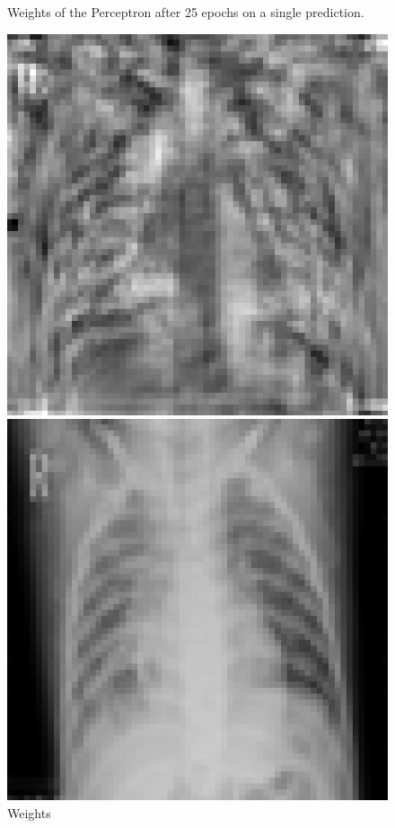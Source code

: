 \documentclass{article}
\begin{document}
\begin{figure}[!ht]
\centering
\caption*{Weights of the Perceptron after 25 epochs on a single prediction.}
  \includegraphics[width=\linewidth]{assets/perceptron/training-1-weights.png}
  \caption*{Weights}\label{fig:training-1-weights}
\endminipage
\xspace
{}
  \includegraphics[width=\linewidth]{assets/perceptron/training-1-predict.png}

\end{figure}
\end{document}
